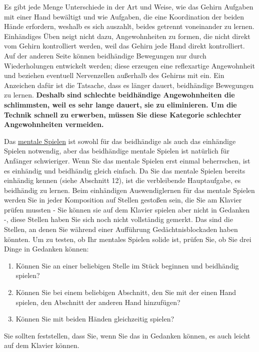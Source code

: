 Es gibt jede Menge Unterschiede in der Art und Weise, wie das Gehirn Aufgaben mit einer Hand bewältigt und wie Aufgaben, die eine Koordination der beiden Hände erfordern, weshalb es sich auszahlt, beides getrennt voneinander zu lernen.
Einhändiges Üben neigt nicht dazu, Angewohnheiten zu formen, die nicht direkt vom Gehirn kontrolliert werden, weil das Gehirn jede Hand direkt kontrolliert.
Auf der anderen Seite können beidhändige Bewegungen nur durch Wiederholungen entwickelt werden; diese erzeugen eine reflexartige Angewohnheit und beziehen eventuell Nervenzellen außerhalb des Gehirns mit ein.
Ein Anzeichen dafür ist die Tatsache, dass es länger dauert, beidhändige Bewegungen zu lernen.
\textbf{Deshalb sind schlechte beidhändige Angewohnheiten die schlimmsten, weil es sehr lange dauert, sie zu eliminieren.
Um die Technik schnell zu erwerben, müssen Sie diese Kategorie schlechter Angewohnheiten vermeiden.}

Das \hyperref[c1ii12mental]{mentale Spielen} ist sowohl für das beidhändige als auch das einhändige Spielen notwendig, aber das beidhändige mentale Spielen ist natürlich für Anfänger schwieriger.
Wenn Sie das mentale Spielen erst einmal beherrschen, ist es einhändig und beidhändig gleich einfach.
Da Sie das mentale Spielen bereits einhändig kennen (siehe Abschnitt 12), ist die verbleibende Hauptaufgabe, es beidhändig zu lernen.
Beim einhändigen Auswendiglernen für das mentale Spielen werden Sie in jeder Komposition auf Stellen gestoßen sein, die Sie am Klavier prüfen mussten - Sie können sie auf dem Klavier spielen aber nicht in Gedanken -, diese Stellen haben Sie sich noch nicht vollständig gemerkt.
Das sind die Stellen, an denen Sie während einer Aufführung Gedächtnisblockaden haben könnten.
Um zu testen, ob Ihr mentales Spielen solide ist, prüfen Sie, ob Sie drei Dinge in Gedanken können:

\begin{enumerate}[label={\arabic*.}] 
 \item Können Sie an einer beliebigen Stelle im Stück beginnen und beidhändig spielen?
 \item Können Sie bei einem beliebigen Abschnitt, den Sie mit der einen Hand spielen, den Abschnitt der anderen Hand hinzufügen?
 \item Können Sie mit beiden Händen gleichzeitig spielen?
\end{enumerate}

Sie sollten feststellen, dass Sie, wenn Sie das in Gedanken können, es auch leicht auf dem Klavier können.

